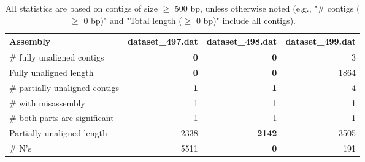 \documentclass[12pt,a4paper]{article}
\begin{document}
\begin{table}[ht]
\begin{center}
\caption{All statistics are based on contigs of size $\geq$ 500 bp, unless otherwise noted (e.g., "\# contigs ($\geq$ 0 bp)" and "Total length ($\geq$ 0 bp)" include all contigs).}
\begin{tabular}{|l*{3}{|r}|}
\hline
Assembly & dataset\_497.dat & dataset\_498.dat & dataset\_499.dat \\ \hline
\# fully unaligned contigs & {\bf 0} & {\bf 0} & 3 \\ \hline
Fully unaligned length & {\bf 0} & {\bf 0} & 1864 \\ \hline
\# partially unaligned contigs & {\bf 1} & {\bf 1} & 4 \\ \hline
\hspace{5mm}\# with misassembly & 1 & 1 & 1 \\ \hline
\hspace{5mm}\# both parts are significant & 1 & 1 & 1 \\ \hline
Partially unaligned length & 2338 & {\bf 2142} & 3505 \\ \hline
\# N's & 5511 & {\bf 0} & 191 \\ \hline
\end{tabular}
\end{center}
\end{table}
\end{document}
